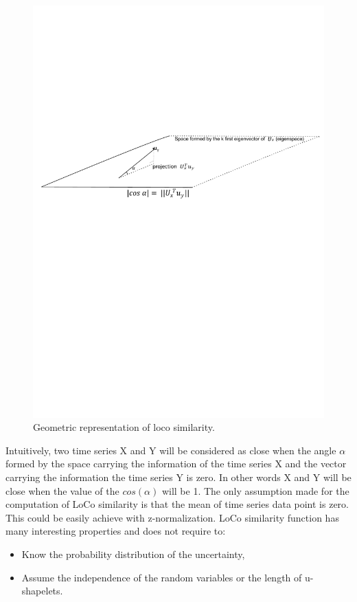 \begin{figure}
\centering
 \includegraphics[scale=0.70]{images/loco2}
\caption{Geometric representation of loco similarity.}
\label{geoLoco}
\end{figure}


Intuitively, two time series X and Y will be considered as close when the angle
$\alpha$ formed by the space carrying the information of the time series X and
the vector carrying the information the time series Y is zero. In other words X
and Y will be close when the value of the $cos(\alpha)$ will be 1. The only
assumption made for the computation of LoCo similarity is that the mean of time
series data point is zero. This could be easily achieve with z-normalization.
LoCo similarity function has many interesting properties and does not require to:
\begin{itemize}
  \item Know the probability distribution of the uncertainty,
  \item Assume the independence of the random variables or the length of
  u-shapelets.
\end{itemize}

